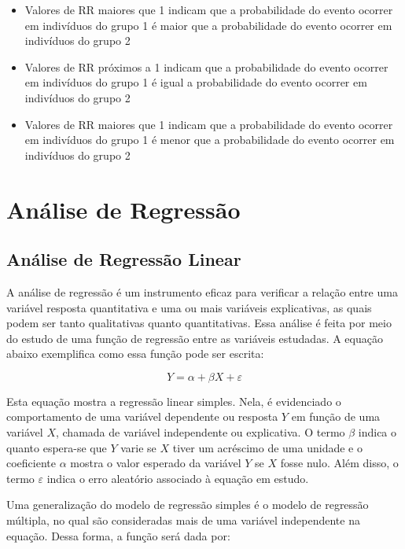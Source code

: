 \documentclass[
]{estat/estat}
\begin{document}
\begin{itemize}
    \item Valores de RR maiores que 1 indicam que a probabilidade do evento ocorrer em indivíduos do grupo 1 é maior que a probabilidade do evento ocorrer em indivíduos do grupo 2
    
    \item Valores de RR próximos a 1 indicam que a probabilidade do evento ocorrer em indivíduos do grupo 1 é igual a probabilidade do evento ocorrer em indivíduos do grupo 2
    
    \item Valores de RR maiores que 1 indicam que a probabilidade do evento ocorrer em indivíduos do grupo 1 é menor que a probabilidade do evento ocorrer em indivíduos do grupo 2
\end{itemize}

\section{Análise de Regressão}\label{anuxe1lise-de-regressuxe3o}

\subsection{Análise de Regressão
Linear}\label{anuxe1lise-de-regressuxe3o-linear}

A análise de regressão é um instrumento eficaz para verificar a relação
entre uma variável resposta quantitativa e uma ou mais variáveis
explicativas, as quais podem ser tanto qualitativas quanto
quantitativas. Essa análise é feita por meio do estudo de uma função de
regressão entre as variáveis estudadas. A equação abaixo exemplifica
como essa função pode ser escrita:

\[
Y=\alpha + \beta X + \varepsilon
\]

Esta equação mostra a regressão linear simples. Nela, é evidenciado o
comportamento de uma variável dependente ou resposta \(Y\) em função de
uma variável \(X\), chamada de variável independente ou explicativa. O
termo \(\beta\) indica o quanto espera-se que \(Y\) varie se \(X\) tiver
um acréscimo de uma unidade e o coeficiente \(\alpha\) mostra o valor
esperado da variável \(Y\) se \(X\) fosse nulo. Além disso, o termo
\(\varepsilon\) indica o erro aleatório associado à equação em estudo.

Uma generalização do modelo de regressão simples é o modelo de regressão
múltipla, no qual são consideradas mais de uma variável independente na
equação. Dessa forma, a função será dada por:
\end{document}
